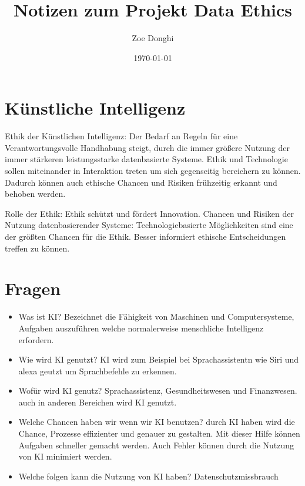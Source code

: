 \documentclass{article}
\title{Notizen zum Projekt Data Ethics}
\author{Zoe Donghi}
\date{\today}
\begin{document}
\maketitle


\tableofcontents
\section{Künstliche Intelligenz}

Ethik der Künstlichen Intelligenz: 
Der Bedarf an Regeln für eine Verantwortungsvolle Handhabung steigt, durch die immer größere Nutzung der immer stärkeren leistungsstarke datenbasierte Systeme. 
Ethik und Technologie sollen miteinander in Interaktion treten um sich gegenseitig bereichern zu können. Dadurch können auch ethische Chancen und Risiken frühzeitig erkannt und behoben werden. 

Rolle der Ethik: 
Ethik schützt und fördert Innovation.
Chancen und Risiken der Nutzung datenbasierender Systeme:
Technologiebasierte Möglichkeiten sind eine der größten Chancen für die Ethik. Besser informiert ethische Entscheidungen treffen zu können.  
\section{Fragen}
\begin{itemize}
\item Was ist KI?
Bezeichnet die Fähigkeit von Maschinen und Computersysteme, Aufgaben auszuführen welche normalerweise menschliche Intelligenz erfordern. 
\item Wie wird KI genutzt?
KI wird zum Beispiel bei Sprachassistentn wie Siri und alexa geutzt um Sprachbefehle zu erkennen. 
\item Wofür wird KI genutz? 
Sprachassistenz, Gesundheitswesen und Finanzwesen. auch in anderen Bereichen wird KI genutzt. 
\item Welche Chancen haben wir wenn wir KI benutzen?
durch KI haben wird die Chance, Prozesse effizienter und genauer zu gestalten. Mit dieser Hilfe können Aufgaben
schneller gemacht werden. Auch Fehler können durch die Nutzung von KI minimiert werden. 
\item Welche folgen kann die Nutzung von KI haben?
Datenschutzmissbrauch
\end{itemize}
\printbibliography
\end{document}
